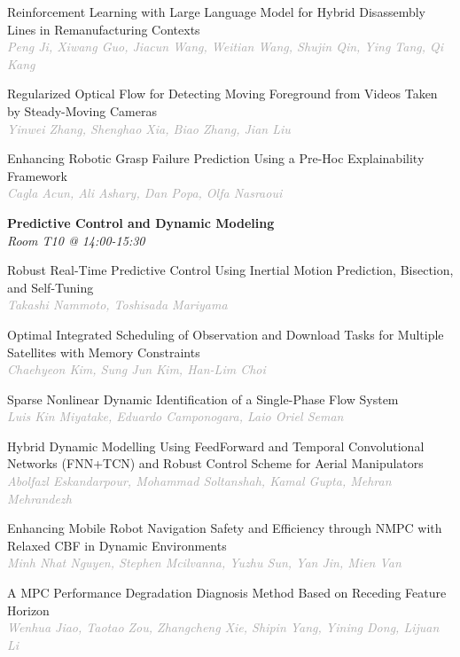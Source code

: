 \begin{multicols*}{2}
\small Reinforcement Learning with Large Language Model for Hybrid Disassembly Lines in Remanufacturing Contexts\\ 
\footnotesize \textcolor{darkgray}{\textit{Peng Ji, Xiwang  Guo, Jiacun  Wang, Weitian  Wang, Shujin  Qin, Ying  Tang, Qi  Kang}}

\small Regularized Optical Flow for Detecting Moving Foreground from Videos Taken by Steady-Moving Cameras\\ 
\footnotesize \textcolor{darkgray}{\textit{Yinwei Zhang, Shenghao  Xia, Biao  Zhang, Jian  Liu}}

\small Enhancing Robotic Grasp Failure Prediction Using a Pre-Hoc Explainability Framework\\ 
\footnotesize \textcolor{darkgray}{\textit{Cagla Acun, Ali  Ashary, Dan  Popa, Olfa  Nasraoui}}

\normalsize \textbf{Predictive Control and Dynamic Modeling}\\
\small \textit{Room T10 @ 14:00-15:30}

\small Robust Real-Time Predictive Control Using Inertial Motion Prediction, Bisection, and Self-Tuning\\ 
\footnotesize \textcolor{darkgray}{\textit{Takashi Nammoto, Toshisada  Mariyama}}

\small Optimal Integrated Scheduling of Observation and Download Tasks for Multiple Satellites with Memory Constraints\\ 
\footnotesize \textcolor{darkgray}{\textit{Chaehyeon Kim, Sung Jun  Kim, Han-Lim  Choi}}

\small Sparse Nonlinear Dynamic Identification of a Single-Phase Flow System\\ 
\footnotesize \textcolor{darkgray}{\textit{Luis Kin Miyatake, Eduardo  Camponogara, Laio Oriel  Seman}}

\small Hybrid Dynamic Modelling Using FeedForward and Temporal Convolutional Networks (FNN+TCN) and Robust Control Scheme for Aerial Manipulators\\ 
\footnotesize \textcolor{darkgray}{\textit{Abolfazl Eskandarpour, Mohammad  Soltanshah, Kamal  Gupta, Mehran  Mehrandezh}}

\small Enhancing Mobile Robot Navigation Safety and Efficiency through NMPC with Relaxed CBF in Dynamic Environments\\ 
\footnotesize \textcolor{darkgray}{\textit{Minh Nhat Nguyen, Stephen  Mcilvanna, Yuzhu  Sun, Yan  Jin, Mien  Van}}

\small A MPC Performance Degradation Diagnosis Method Based on Receding Feature Horizon\\ 
\footnotesize \textcolor{darkgray}{\textit{Wenhua Jiao, Taotao  Zou, Zhangcheng  Xie, Shipin  Yang, Yining  Dong, Lijuan  Li}}


\end{multicols*}
